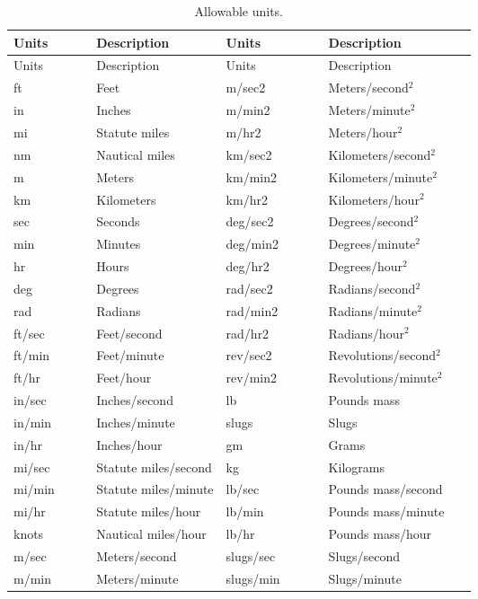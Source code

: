 \begin{longtable}{@{}>{\ttfamily}lp{0.29\linewidth}>{\ttfamily}lp{0.32\linewidth}@{}}
  \caption{Allowable units.}\label{tab:allowable-units}\\
  \toprule
  \normalfont Units & Description & \normalfont Units & Description \\
  \midrule
  \endfirsthead
  \toprule
  \normalfont Units & Description & \normalfont Units & Description \\
  \midrule
  \endhead
  ft & Feet & m/sec2 & Meters/second$^2$ \\
  in & Inches & m/min2 & Meters/minute$^2$ \\
  mi & Statute miles & m/hr2 & Meters/hour$^2$ \\
  nm & Nautical miles & km/sec2 & Kilometers/second$^2$ \\
  m & Meters & km/min2 & Kilometers/minute$^2$ \\
  km & Kilometers & km/hr2 & Kilometers/hour$^2$ \\
  sec & Seconds & deg/sec2 & Degrees/second$^2$ \\
  min & Minutes & deg/min2 & Degrees/minute$^2$ \\
  hr & Hours & deg/hr2 & Degrees/hour$^2$ \\
  deg & Degrees & rad/sec2 & Radians/second$^2$ \\
  rad & Radians & rad/min2 & Radians/minute$^2$ \\
  ft/sec & Feet/second & rad/hr2 & Radians/hour$^2$ \\
  ft/min & Feet/minute & rev/sec2 & Revolutions/second$^2$ \\
  ft/hr & Feet/hour & rev/min2 & Revolutions/minute$^2$ \\
  in/sec & Inches/second & lb & Pounds mass \\
  in/min & Inches/minute & slugs & Slugs \\
  in/hr & Inches/hour & gm & Grams \\
  mi/sec & Statute miles/second & kg & Kilograms \\
  mi/min & Statute miles/minute & lb/sec & Pounds mass/second \\
  mi/hr & Statute miles/hour & lb/min & Pounds mass/minute \\
  knots & Nautical miles/hour & lb/hr & Pounds mass/hour \\
  m/sec & Meters/second & slugs/sec & Slugs/second \\
  m/min & Meters/minute & slugs/min & Slugs/minute \\

\end{longtable}
